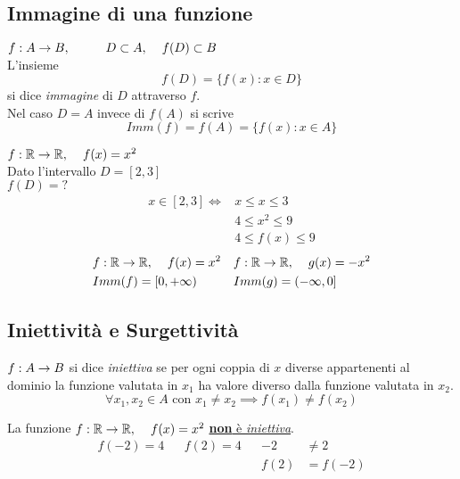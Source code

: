 \documentclass{article}
\begin{document}
\subsection{Immagine di una funzione}
\begin{dfn}
\(f: A \rightarrow B,\hspace{1cm} D \subset A,\hspace{.4cm} f(D) \subset B\)\\
L'insieme
\[f(D) = \{f(x) : x \in D\}\]
si dice \emph{immagine} di \(D\) attraverso \(f\).\\
Nel caso \(D = A\) invece di \(f(A)\) si scrive
\[Imm(f) = f(A) = \{f(x) : x \in A \}\]
\end{dfn}

\begin{eg}
\(f: \mathbb{R} \rightarrow \mathbb{R},\hspace{.4cm} f(x) = x^2\)\\
Dato l'intervallo \(D = [2,3]\)\\
\(f(D) = ?\)
\begin{align*}
x \in [2,3] \iff    &x \leq x \leq 3\\
                    &4 \leq x^2 \leq 9\\
                    &4 \leq f(x) \leq 9
\end{align*}
\begin{align*}
    & f: \mathbb{R} \rightarrow \mathbb{R},\hspace{.4cm} f(x) = x^2 && f: \mathbb{R} \rightarrow \mathbb{R},\hspace{.4cm} g(x) = -x^2\\
    & Imm(f) = [0, +\infty)                     && Imm(g) = (-\infty, 0]
\end{align*}
\end{eg}

\subsection{Iniettività e Surgettività}
\begin{dfn}
\(f: A \rightarrow B\) si dice \emph{iniettiva} se per ogni coppia di \(x\) diverse appartenenti al dominio la funzione valutata in \(x_1\) ha valore diverso dalla funzione valutata in \(x_2\).
\[\forall x_1,x_2 \in A \text{ con } x_1 \neq x_2 \implies f(x_1) \neq f(x_2)\]
\end{dfn}

\begin{eg}
La funzione \(f: \mathbb{R} \rightarrow \mathbb{R},\hspace{.4cm} f(x) = x^2\) \underline{\textbf{non} è \emph{iniettiva}}.
\begin{align*}
    f(-2) = 4 && f(2) = 4 && -2   &\neq 2\\
              &&          && f(2) &= f(-2)
\end{align*}
\end{eg}
\end{document}
